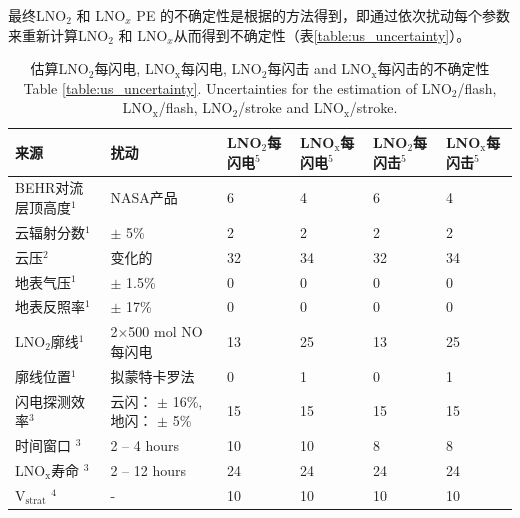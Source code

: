 最终LNO$_2$ 和 LNO$_x$ PE 的不确定性是根据\citet{Pickering.2016,Allen.2019,Bucsela.2019,Lapierre.2020}的方法得到，即通过依次扰动每个参数来重新计算LNO$_2$ 和 LNO$_x$从而得到不确定性（表\ref{table:us_uncertainty}）。


\begin{table}[!htbp]
\centering
\scriptsize
\caption{估算LNO$_\textrm{2}$每闪电, LNO$_\textrm{x}$每闪电, LNO$_\textrm{2}$每闪击 and LNO$_\textrm{x}$每闪击的不确定性\\ Table \ref{table:us_uncertainty}. Uncertainties for the estimation of LNO$_\textrm{2}$/flash, LNO$_\textrm{x}$/flash, LNO$_\textrm{2}$/stroke and LNO$_\textrm{x}$/stroke.}
\begin{tabular}{llllll}
\hline
\textbf{来源} & \textbf{扰动} & \textbf{LNO$_\textrm{2}$每闪电$^5$} & \textbf{LNO$_\textrm{x}$每闪电$^5$} & \textbf{LNO$_\textrm{2}$每闪击$^5$} & \textbf{LNO$_\textrm{x}$每闪击$^5$} \\
\hline
BEHR对流层顶高度$^1$                    & NASA产品                              & 6   & 4   & 6   & 4 \\
云辐射分数$^1$                          & $\pm$ 5\%                            & 2   & 2   & 2   & 2 \\
云压$^2$                               & 变化的                                & 32  & 34  & 32  & 34 \\
地表气压$^1$                            & $\pm$ 1.5\%                          & 0   & 0   & 0   & 0 \\
地表反照率$^1$                          & $\pm$ 17\%                           & 0   & 0   & 0   & 0 \\
LNO$_\textrm{2}$廓线$^1$               & 2$\times$500 mol NO每闪电             & 13  & 25  & 13  & 25 \\
廓线位置$^1$                            & 拟蒙特卡罗法                           & 0   & 1   & 0   & 1 \\
闪电探测效率$^3$                        & 云闪： $\pm$ 16\%, 地闪： $\pm$ 5\%        & 15  & 15  & 15  & 15 \\
时间窗口%
$^3$                                  & 2 -- 4 hours                         & 10  & 10  & 8   & 8 \\
LNO$_\textrm{x}$寿命%
$^3$                                  & 2 -- 12 hours                        & 24  & 24  & 24  & 24 \\
V$_\textrm{strat}$%
$^4$                                  & -                                    & 10  & 10  & 10  & 10 \\

\end{tabular}
\end{table}
